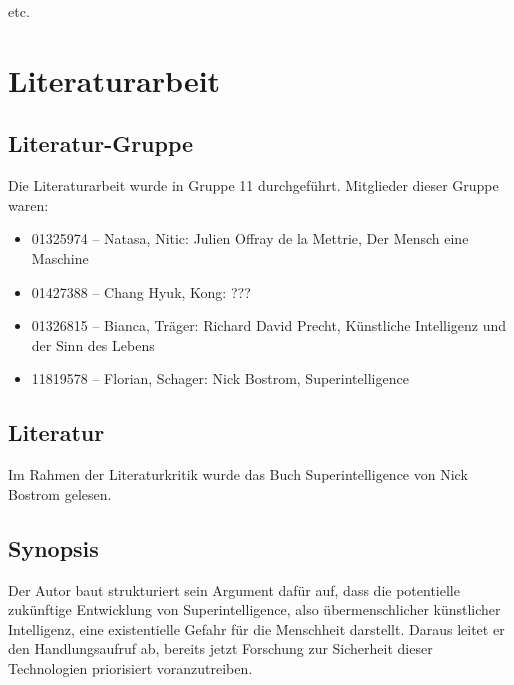 \documentclass[twoside, a4paper, DIV=11, open=any, bibliography=totoc]{scrbook}
\newcommand{\Quote}[1]{\glqq #1\grqq{}}
\begin{document}
etc.

\chapter{Literaturarbeit} \label{chp:LitKrit}

\section{Literatur-Gruppe} \label{sec:litgruppe}

Die Literaturarbeit wurde in Gruppe 11 durchgeführt. Mitglieder dieser Gruppe waren:

\begin{itemize}
    \item 01325974 – Natasa, Nitic: Julien Offray de la Mettrie, Der Mensch eine Maschine
    \item 01427388 – Chang Hyuk, Kong: ???
    \item 01326815 – Bianca, Träger: Richard David Precht, Künstliche Intelligenz und der Sinn des Lebens
    \item 11819578 – Florian, Schager: Nick Bostrom, Superintelligence
\end{itemize}


\section{Literatur} \label{sec:litlit}

Im Rahmen der Literaturkritik wurde das Buch Superintelligence von Nick Bostrom gelesen.

\section{Synopsis} \label{sec:litsynops}

Der Autor baut strukturiert sein Argument dafür auf, dass die potentielle zukünftige
Entwicklung von \Quote{Superintelligence}, also übermenschlicher künstlicher Intelligenz,
eine existentielle Gefahr für die Menschheit darstellt. Daraus leitet er den
Handlungsaufruf ab, bereits jetzt Forschung zur Sicherheit dieser Technologien
priorisiert voranzutreiben.
\end{document}
